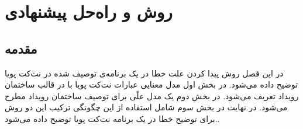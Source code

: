 \chapter{روش و راه‌حل پیشنهادی}
\section{مقدمه}
در این فصل روش پیدا کردن علت خطا در یک برنامه‌ی توصیف شده در نت‌کت پویا توضیح داده می‌شود.
در بخش اول مدل معنایی عبارات نت‌کت پویا با در قالب ساختمان رویداد تعریف می‌شود.
در بخش دوم یک مدل علّی برای توصیف ساختمان رویداد مطرح می‌شود.
در نهایت در بخش سوم شامل استفاده از این چگونگی ترکیب این دو روش برای توضیح خطا در یک برنامه نت‌کت پویا توضیح داده می‌شود..







